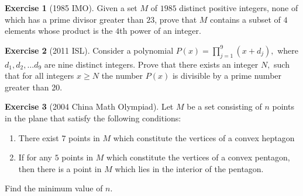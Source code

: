 \documentclass[l1pt]{article}
\theoremstyle{plain}
\theoremstyle{definition}
\newtheorem{exercise}{Exercise}[section]
\theoremstyle{remark}
\begin{document}
\begin{exercise}[1985 IMO]
 Given a set $M$ of $1985$ distinct positive integers, none of which has a prime divisor greater than $23$, prove that $M$ contains a subset of $4$ elements whose product is the $4$th power of an integer.
\end{exercise}

\begin{exercise} [2011 ISL]
 Consider a polynomial $P(x) =  \prod^9_{j=1}(x+d_j),$ where $d_1, d_2, \ldots d_9$ are nine distinct integers. Prove that there exists an integer $N,$ such that for all integers $x \geq N$ the number $P(x)$ is divisible by a prime number greater than 20.
\end{exercise}

\begin{exercise}[2004 China Math Olympiad]
 Let $M$ be a set consisting of $n$ points in the plane that satisfy the following conditions:
 \begin{enumerate}
     \item There exist $7$ points in $M$ which constitute the vertices of a convex heptagon
     \item If for any $5$ points in $M$ which constitute the vertices of a convex pentagon, then there is a point in $M$ which lies in the interior of the pentagon.
 \end{enumerate}
Find the minimum value of $n$.
\end{exercise}
\end{document}
